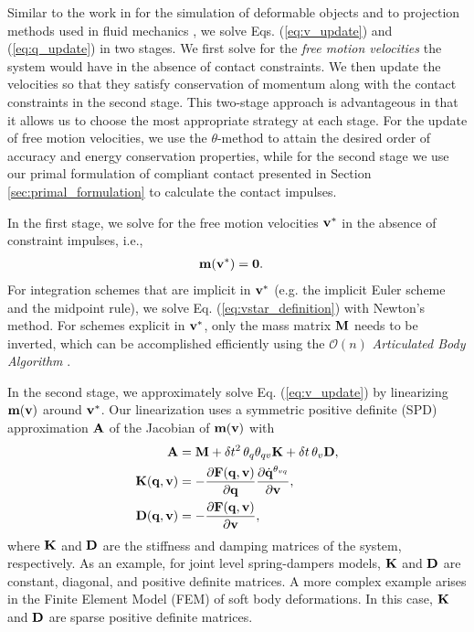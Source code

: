 Similar to the work in \cite{bib:duriez2005realistic} for the simulation of
deformable objects and to projection methods used in fluid mechanics
\cite{bib::bell1991efficient}, we solve Eqs. (\ref{eq:v_update}) and
(\ref{eq:q_update}) in two stages. We first solve for the \emph{free motion
velocities} the system would have in the absence of contact constraints. We then
update the velocities so that they satisfy conservation of momentum along with
the contact constraints in the second stage. This two-stage approach is
advantageous in that it allows us to choose the most appropriate strategy at
each stage. For the update of free motion velocities, we use the
$\theta\text{-method}$ to attain the desired order of accuracy and energy
conservation properties, while for the second stage we use our primal
formulation of compliant contact presented in Section
\ref{sec:primal_formulation} to calculate the contact impulses.

In the first stage, we solve for the free motion velocities ${\mathbf{v}}^*$ in the
absence of constraint impulses, i.e.,
\begin{align}
	\mf{m}(\mf{v}^*) &= \mf{0}.
	\label{eq:vstar_definition}
\end{align}
For integration schemes that are implicit in ${\mathbf{v}}^*$ (e.g. the implicit Euler
scheme and the midpoint rule), we solve Eq. (\ref{eq:vstar_definition}) with
Newton's method. For schemes explicit in ${\mathbf{v}}^*$, only the mass matrix
${\mathbf{M}}$ needs to be inverted, which can be accomplished efficiently using the
$\mathcal{O}(n)$ \emph{Articulated Body Algorithm}
\cite{bib:featherstone2008_rigid_body_dynamics_algorithms}.

In the second stage, we approximately solve Eq. (\ref{eq:v_update}) by
linearizing ${\mathbf{m}}({\mathbf{v}})$ around ${\mathbf{v}}^*$. Our linearization uses a
symmetric positive definite (SPD) approximation ${\mathbf{A}}$ of the Jacobian
of ${\mathbf{m}}({\mathbf{v}})$ with
\begin{align}
	\mf{A}&=\mf{M}+\delta t^2\,\theta_q\theta_{qv}\mf{K}+\delta t\,\theta_v\mf{D},
	\label{eq:expression_for_A}\\
	\mf{K}(\mf{q}, \mf{v})&=-\frac{\partial \mf{F}(\mf{q}, \mf{v})}{\partial
	\mf{q}}\frac{\partial\dot{\mf{q}}^{\theta_{vq}}}{\partial\mf{v}},
	\label{eq:stiffness_matrix}\\
	\mf{D}(\mf{q}, \mf{v})&=-\frac{\partial \mf{F}(\mf{q}, \mf{v})}{\partial
	\mf{v}},
	\label{eq:dissipation_matrix}
\end{align}
where ${\mathbf{K}}$ and ${\mathbf{D}}$ are the stiffness and damping matrices of the
system, respectively. As an example, for joint level spring-dampers models,
${\mathbf{K}}$ and ${\mathbf{D}}$ are constant, diagonal, and positive definite matrices. A
more complex example arises in the Finite Element Model (FEM) of soft body
deformations. In this case, ${\mathbf{K}}$ and ${\mathbf{D}}$ are sparse positive definite
matrices.

